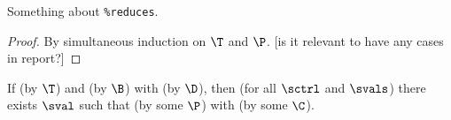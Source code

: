 \Twelf Something about \texttt{\%reduces}.

\begin{proof}
By simultaneous induction on $\T$ and $\P$.
[is it relevant to have any cases in report?]
\end{proof}

\begin{lemma}[Completeness]
\label{lem:completeness-bs}
If  (by $\T$) and \bev{\benv}{\bexp}{\bval} (by $\B$) with \cor{\benv}{\senv} (by $\D$), then (for all $\sctrl$ and $\svals$) there exists $\sval$ such that  (by some $\P$) with \cor{\bval}{\sval} (by some $\C$).
\end{lemma}

